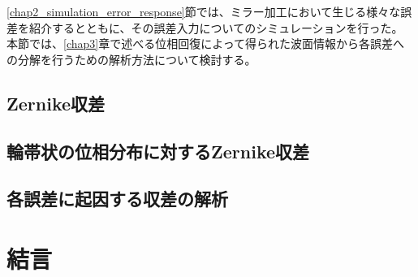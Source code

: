 \ref{chap2_simulation_error_response}節では、ミラー加工において生じる様々な誤差を紹介するとともに、その誤差入力についてのシミュレーションを行った。
本節では、\ref{chap3}章で述べる位相回復によって得られた波面情報から各誤差への分解を行うための解析方法について検討する。

\subsection{Zernike収差}

\subsection{輪帯状の位相分布に対するZernike収差}


\subsection{各誤差に起因する収差の解析}



\section{結言}
\label{chap2_conclusion}




